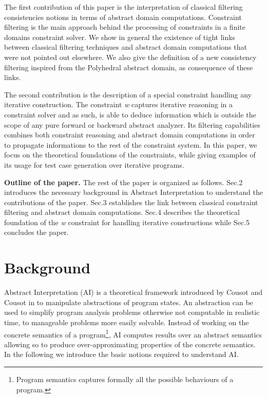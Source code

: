 \documentclass[submission,copyright,creativecommons]{eptcs}
\begin{document}
The first contribution of this paper is the interpretation of classical filtering consistencies notions in terms of 
abstract domain computations. Constraint filtering is the main approach behind the processing of constraints in a finite domains constraint solver. We show in general the existence of tight links between classical filtering techniques and abstract domain computations that were not pointed out elsewhere. We also give the definition of a new consistency filtering inspired from the Polyhedral abstract domain, as consequence of these links. 

The second contribution is the description of a special constraint handling any iterative construction. The constraint {\it w} captures iterative reasoning in a constraint solver and as such, is able to deduce information which is outside the scope of any pure forward or backward abstract analyzer. Its filtering capabilities combines both constraint reasoning and abstract domain computations in order to propagate informations to the rest of the constraint system. In this paper, we focus on the theoretical foundations of the constraints, while giving examples of its usage for test case generation over iterative programs.


{\bf Outline of the paper.}
The rest of the paper is organized as follows. Sec.2 introduces the necessary background in Abstract Interpretation to understand the contributions of the paper. Sec.3 establishes the link between classical constraint filtering and abstract domain computations. Sec.4 describes the theoretical foundation of the {\it w} constraint for handling iterative constructions while Sec.5 concludes the paper.

\section{Background}


Abstract Interpretation (AI) is a theoretical framework introduced by Cousot and Cousot in \cite{CC77} to manipulate
abstractions of program states. An abstraction can be used to simplify program analysis problems otherwise not
computable in realistic time, to manageable problems more easily solvable.
Instead of working on the concrete semantics of a 
program\footnote{Program semantics captures formally all the possible behaviours of a program.}, 
AI computes results over an abstract semantics 
allowing so to produce over-approximating properties of the concrete semantics.
In the following we introduce the basic notions required to understand AI. 
\end{document}
